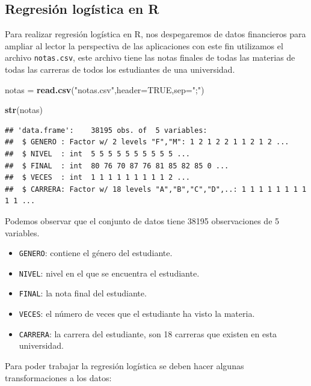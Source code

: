 \documentclass[
]{krantz}
\makeatletter
\newenvironment{Shaded}{\begin{snugshade}}{\end{snugshade}}
\newcommand{\DataTypeTok}[1]{\textcolor[rgb]{0.27,0.27,0.27}{#1}}
\newcommand{\KeywordTok}[1]{\textcolor[rgb]{0.27,0.27,0.27}{\textbf{#1}}}
\newcommand{\NormalTok}[1]{#1}
\newcommand{\OtherTok}[1]{\textcolor[rgb]{0.37,0.37,0.37}{#1}}
\newcommand{\StringTok}[1]{\textcolor[rgb]{0.5,0.5,0.5}{#1}}
\providecommand{\tightlist}{%
  \setlength{\itemsep}{0pt}\setlength{\parskip}{0pt}}
\newenvironment{kframe}{%
\medskip{}
\setlength{\fboxsep}{.8em}
 \def\at@end@of@kframe{}%
 \ifinner\ifhmode%
  \def\at@end@of@kframe{\end{minipage}}%
  \begin{minipage}{\columnwidth}%
 \fi\fi%
 \def\FrameCommand##1{\hskip\@totalleftmargin \hskip-\fboxsep
 \colorbox{shadecolor}{##1}\hskip-\fboxsep
     \hskip-\linewidth \hskip-\@totalleftmargin \hskip\columnwidth}%
 \MakeFramed {\advance\hsize-\width
   \@totalleftmargin\z@ \linewidth\hsize
   \@setminipage}}%
 {\par\unskip\endMakeFramed%
 \at@end@of@kframe}
\renewenvironment{Shaded}{\begin{kframe}}{\end{kframe}}
\makeatother
\begin{document}
\hypertarget{regresion-logistica-en-r}{%
\subsection{Regresión logística en R}\label{regresion-logistica-en-r}}

Para realizar regresión logística en R, nos despegaremos de datos financieros para ampliar al lector la perspectiva de las aplicaciones con este fin utilizamos el archivo \texttt{notas.csv}, este archivo tiene las notas finales de todas las materias de todas las carreras de todos los estudiantes de una universidad.

\begin{Shaded}
\begin{Highlighting}[]
\NormalTok{notas =}\StringTok{ }\KeywordTok{read.csv}\NormalTok{(}\StringTok{"notas.csv"}\NormalTok{,}\DataTypeTok{header=}\OtherTok{TRUE}\NormalTok{,}\DataTypeTok{sep=}\StringTok{";"}\NormalTok{)}

\KeywordTok{str}\NormalTok{(notas)}
\end{Highlighting}
\end{Shaded}

\begin{verbatim}
## 'data.frame':    38195 obs. of  5 variables:
##  $ GENERO : Factor w/ 2 levels "F","M": 1 2 1 2 2 1 1 2 1 2 ...
##  $ NIVEL  : int  5 5 5 5 5 5 5 5 5 5 ...
##  $ FINAL  : int  80 76 70 87 76 81 85 82 85 0 ...
##  $ VECES  : int  1 1 1 1 1 1 1 1 1 2 ...
##  $ CARRERA: Factor w/ 18 levels "A","B","C","D",..: 1 1 1 1 1 1 1 1 1 1 ...
\end{verbatim}

Podemos observar que el conjunto de datos tiene 38195 observaciones de 5 variables.

\begin{itemize}
\tightlist
\item
  \texttt{GENERO}: contiene el género del estudiante.
\item
  \texttt{NIVEL}: nivel en el que se encuentra el estudiante.
\item
  \texttt{FINAL}: la nota final del estudiante.
\item
  \texttt{VECES}: el número de veces que el estudiante ha visto la materia.
\item
  \texttt{CARRERA}: la carrera del estudiante, son 18 carreras que existen en esta universidad.
\end{itemize}

Para poder trabajar la regresión logística se deben hacer algunas transformaciones a los datos:
\end{document}
